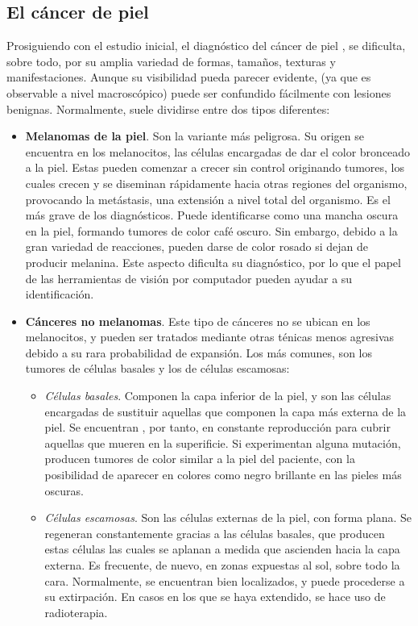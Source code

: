 \newpage
\subsection{El cáncer de piel}

Prosiguiendo con el estudio inicial, el diagnóstico del cáncer de piel  \cite{cancerpieltipos}, se dificulta, sobre todo, por su amplia variedad de formas, tamaños, texturas y manifestaciones. Aunque su visibilidad pueda parecer evidente, (ya que es observable a nivel macroscópico) puede ser confundido fácilmente con lesiones benignas. Normalmente, suele dividirse entre dos tipos diferentes:
\begin{itemize}
	\item \textbf{Melanomas de la piel}. Son la variante más peligrosa. Su origen se encuentra en los melanocitos, las células encargadas de dar el color bronceado a la piel.  Estas pueden comenzar a crecer sin control originando tumores, los cuales crecen y se diseminan rápidamente hacia otras regiones del organismo, provocando la metástasis, una extensión a nivel total del organismo. Es el más grave de los diagnósticos. Puede identificarse como una mancha oscura en la piel, formando tumores de color café oscuro. Sin embargo, debido a la gran variedad de reacciones, pueden darse de color rosado si dejan de producir melanina. Este aspecto dificulta su diagnóstico, por lo que el papel de las herramientas de visión por computador pueden ayudar a su identificación.
	\item \textbf{Cánceres no melanomas}. Este tipo de cánceres no se ubican en los melanocitos, y pueden ser tratados mediante otras ténicas menos agresivas debido a su rara probabilidad de expansión. Los más comunes, son los tumores de células basales y los de células escamosas:
	\begin{itemize}
		\item \textit{Células basales}. Componen la capa inferior de la piel, y son las células encargadas de sustituir aquellas que componen la capa más externa de la piel. Se encuentran , por tanto, en constante reproducción para cubrir aquellas que mueren en la superificie. Si experimentan alguna mutación, producen tumores de color similar a la piel del paciente, con la posibilidad de aparecer en colores como negro brillante en las pieles más oscuras.
		
		\item \textit{Células escamosas}. Son las células externas de la piel, con forma plana. Se regeneran constantemente gracias a las células basales, que producen estas células las cuales se aplanan a medida que ascienden hacia la capa externa. Es frecuente, de nuevo, en zonas expuestas al sol, sobre todo la cara. Normalmente, se encuentran bien localizados, y puede procederse a su extirpación. En casos en los que se haya extendido, se hace uso de radioterapia.
		
	\end{itemize}
\end{itemize}

